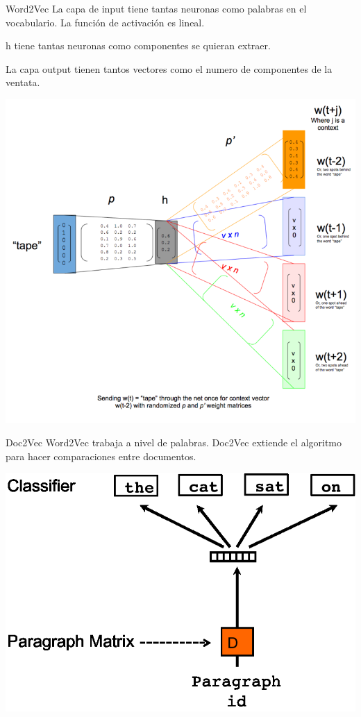 \documentclass{beamer}
\begin{document}
  \begin{frame}{Word2Vec}
      La capa de input tiene tantas neuronas como palabras en el vocabulario. La función de activación es lineal.

      h tiene tantas neuronas como componentes se quieran extraer.

      La capa output tienen tantos vectores como el numero de componentes de la ventata.

      \centering
      \includegraphics[scale=0.50]{./figures/skip-gram-exp.png}
  \end{frame}
  \begin{frame}{Doc2Vec}
      Word2Vec trabaja a nivel de palabras. Doc2Vec extiende el algoritmo para hacer comparaciones entre documentos.

      \centering
      \includegraphics[scale=0.50]{./figures/distributed_bag_of_words.pdf}
  \end{frame}
\end{document}

